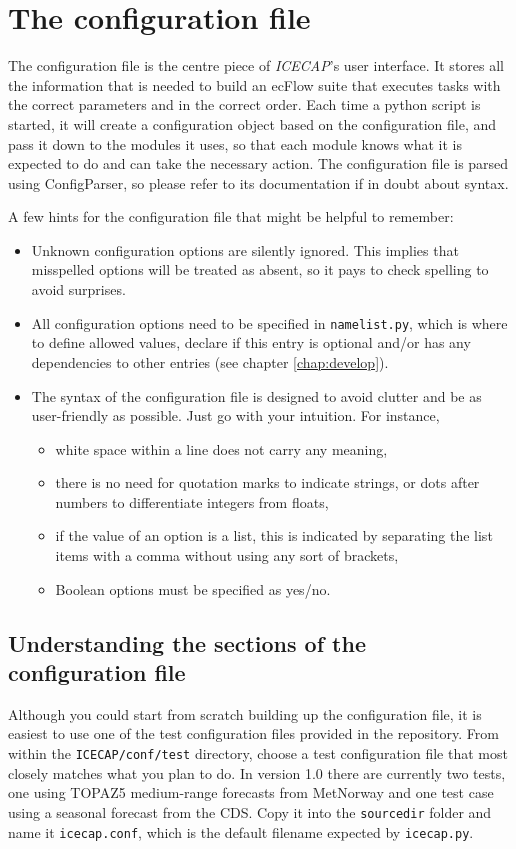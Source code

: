 \documentclass[DIV=10, parskip=full]{scrreprt}
\newcommand{\ice}{\textit{ICECAP}\xspace}
\newcommand{\version}{1.0\xspace}
\begin{document}
\section{The configuration file}\label{chap:config}
The configuration file is the centre piece of {\ice}'s user interface. It stores  all the information that is needed to build an ecFlow suite that executes tasks with the correct parameters and in the correct order. Each time a python script is started, it will create a configuration object based on the configuration file, and pass it down to the modules it uses, so that each module knows what it is expected to do and can take the necessary action. The configuration file is parsed using ConfigParser, so please refer to its documentation if in doubt about syntax. 

A few hints for the configuration file that might be helpful to remember:
\begin{itemize}
 \item Unknown configuration options are silently ignored. This implies that misspelled options will be treated as absent, so it pays to check spelling to avoid surprises.
 \item All configuration options need to be specified in \texttt{namelist.py}, which is where to define allowed values, declare if this entry is optional and/or has any dependencies to other entries (see chapter \ref{chap:develop}).
 \item The syntax of the configuration file is designed to avoid clutter and be as user-friendly as possible. Just go with your intuition. For instance,
 \begin{itemize}
   \item white space within a line does not carry any meaning,
   \item there is no need for quotation marks to indicate strings, or dots after numbers to differentiate integers from floats,
   \item if the value of an option is a list, this is indicated by separating the list items with a comma without using any sort of brackets,
   \item Boolean options must be specified as yes/no.
 \end{itemize}
\end{itemize}


\subsection{Understanding the sections of the configuration file}
Although you could start from scratch building up the configuration file, it is easiest to use one of the test configuration files provided in the repository. From within the \texttt{ICECAP/conf/test} directory, choose a test configuration file that most closely matches what you plan to do. In version \version there are currently two tests, one using TOPAZ5 medium-range forecasts from MetNorway and one test case using a seasonal forecast from the CDS. Copy it into the \texttt{sourcedir} folder and name it \texttt{icecap.conf}, which is the default filename expected by \texttt{icecap.py}. 
\end{document}
